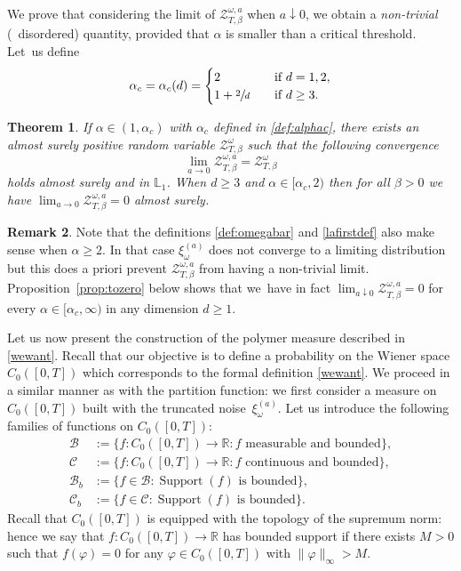 \documentclass[JEP,XML,SOM,Unicode,published]{cedram}
\let\mathcal\mathscr
\let\sep:
\let\ra\rightarrow
\newtheorem{theorem}{Theorem}[section]
\theoremstyle{definition}
\newtheorem{rem}[theorem]{Remark}
\newcommand{\cB}{{\ensuremath{\mathcal B}} }
\newcommand{\cC}{{\ensuremath{\mathcal C}} }
\newcommand{\cZ}{{\ensuremath{\mathcal Z}} }
\DeclareMathOperator*{\supp}{\mathrm{Support}}
\newcommand{\bbL}{{\ensuremath{\mathbb L}} }
\newcommand{\bbR}{{\ensuremath{\mathbb R}} }
\let\go\omega
\begin{document}
We prove that considering the limit of $\cZ^{\go,a}_{T,\beta}$ when $a\downarrow0$, we obtain a \emph{non-trivial} (\ie \ disordered) quantity, provided that $\alpha$ is smaller than a critical threshold.
Let~us define
\begin{equation}
\label{def:alphac}
\alpha_c=\alpha_c(d) =
\begin{cases}
2 & \quad \text{if } d=1,2,\\
1+ \sfrac{2}{d}& \quad \text{if } d\ge 3.
\end{cases}
\end{equation}

\begin{theorem}
\label{thm:continuous}
If $\alpha\in (1,\alpha_c)$ with $\alpha_c$ defined in \eqref{def:alphac},
there exists an almost surely positive random variable $\cZ^{\go }_{T, \beta}$
such that the following convergence
\begin{equation*}
\lim_{a \to 0}\cZ^{\go,a }_{T, \beta}=\cZ^{\go }_{T, \beta}
\end{equation*}
holds almost surely and in $\bbL_1$.
When $d\ge 3$ and $\alpha\in [\alpha_c,2)$ then for all $\beta>0$ we have
$\lim_{a \to 0}\cZ^{\go,a }_{T, \beta}=0$ almost surely.
\end{theorem}

\begin{rem}
Note that the definitions \eqref{def:omegabar} and \eqref{lafirstdef} also make sense when $\alpha\ge 2$. In that case $\xi^{(a)}_{\go}$ does not converge to a limiting distribution but this does a priori prevent $\cZ^{\go,a}_{T,\beta}$ from having a non-trivial limit.
Proposition~\ref{prop:tozero} below shows that we~have in fact $\lim_{a\downarrow 0}\cZ^{\go,a }_{T, \beta} = 0$ for every $\alpha\in [\alpha_c,\infty)$ in any dimension $d\ge 1$.
\end{rem}

Let us now present the construction of the polymer measure described in \eqref{wewant}.
Recall that our objective is to define a probability on
the Wiener space $C_0([0,T])$
which corresponds to the formal definition \eqref{wewant}.
We proceed in a similar manner as with the partition function: we first consider a measure on $C_0([0,T])$ built with the truncated noise~$\xi_{\go}^{(a)}$.
Let us introduce the following families of functions on $C_0([0,T])$:%
\begin{equation}\label{thespaces}
\begin{split}
\cB&:=\{ f\colon C_0([0,T]) \ra \bbR \sep f \text{ measurable and bounded}\},\\
\cC&:=\{ f \colon C_0([0,T]) \ra \bbR \sep f \text{ continuous and bounded}\},\\
\cB_b&:=\{ f\in \cB \sep \supp(f) \text{ is bounded}\},\\
\cC_b&:=\{ f\in \cC \sep \supp(f) \text{ is bounded}\}.
\end{split}
\end{equation}
Recall that $C_0([0,T])$ is equipped with the topology of the supremum norm: hence we say that $f\colon C_0([0,T]) \to \bbR$ has bounded support if there exists $M>0$ such that $f(\varphi) =0$ for any $\varphi \in C_0([0,T])$ with $\|\varphi\|_{\infty} >M$.
\end{document}
